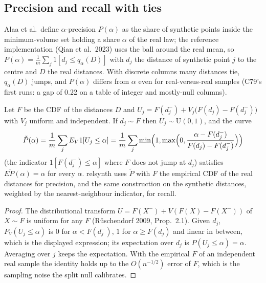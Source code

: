 \subsection{Precision and recall with ties}
Alaa et al.\ define $\alpha$-precision $P(\alpha)$ as the share of synthetic points inside the minimum-volume set holding a share $\alpha$ of the real law; the reference implementation (Qian et al.\ 2023) uses the ball around the real mean, so $P(\alpha)=\frac1m\sum_j 1[d_j\le q_\alpha(D)]$ with $d_j$ the distance of synthetic point $j$ to the centre and $D$ the real distances. With discrete columns many distances tie, $q_\alpha(D)$ jumps, and $P(\alpha)$ differs from $\alpha$ even for real-versus-real samples (C79's first runs: a gap of 0.22 on a table of integer and mostly-null columns).

\begin{proposition}\label{prop:pitcurve}
Let $F$ be the CDF of the distances $D$ and $U_j=F(d_j^-)+V_j\bigl(F(d_j)-F(d_j^-)\bigr)$ with $V_j$ uniform and independent. If $d_j\sim F$ then $U_j\sim\mathrm{U}(0,1)$, and the curve
\[
\tilde P(\alpha)=\frac1m\sum_j E_V 1[U_j\le\alpha]=\frac1m\sum_j \min\Bigl(1,\max\Bigl(0,\frac{\alpha-F(d_j^-)}{F(d_j)-F(d_j^-)}\Bigr)\Bigr)
\]
(the indicator $1[F(d_j^-)\le\alpha]$ where $F$ does not jump at $d_j$) satisfies $E\tilde P(\alpha)=\alpha$ for every $\alpha$. relsynth uses $\tilde P$ with $F$ the empirical CDF of the real distances for precision, and the same construction on the synthetic distances, weighted by the nearest-neighbour indicator, for recall.
\end{proposition}
\begin{proof}
The distributional transform $U=F(X^-)+V(F(X)-F(X^-))$ of $X\sim F$ is uniform for any $F$ (R\"uschendorf 2009, Prop.~2.1). Given $d_j$, $P_V(U_j\le\alpha)$ is $0$ for $\alpha<F(d_j^-)$, $1$ for $\alpha\ge F(d_j)$ and linear in between, which is the displayed expression; its expectation over $d_j$ is $P(U_j\le\alpha)=\alpha$. Averaging over $j$ keeps the expectation. With the empirical $F$ of an independent real sample the identity holds up to the $O(n^{-1/2})$ error of $F$, which is the sampling noise the split null calibrates.
\end{proof}

